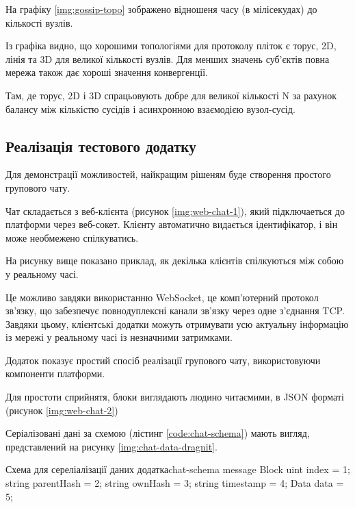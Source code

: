 \documentclass{lib/styles/default-style}
\begin{document}
    На графіку \ref{img:gossip-topo} зображено відношеня часу (в мілісекудах) до кількості вузлів.


    Із графіка видно, що хорошими топологіями для протоколу пліток є торус, 2D,
    лінія та 3D для великої кількості вузлів.
    Для менших значень суб'єктів повна мережа також дає хороші значення конвергенції.

    Там, де торус, 2D і 3D спрацьовують добре для великої кількості N
    за рахунок балансу між кількістю сусідів і асинхронною взаємодією вузол-сусід.
    
\subsection{Реалізація тестового додатку}

    Для демонстрації можливостей, найкращим рішеням буде створення простого групового чату.

    Чат складається з веб-клієнта (рисунок \ref{img:web-chat-1}), який підключаеться до платформи через веб-сокет.
    Клієнту автоматично видається ідентифікатор, і він може необмежено спілкуватись.


    На рисунку вище показано приклад, як декілька клієнтів спілкуються між собою у реальному часі.

    Це можливо завдяки використанню WebSocket,
    це комп'ютерний протокол зв'язку, що забезпечує повнодуплексні канали зв'язку через одне з'єднання TCP.
    Завдяки цьому, клієнтські додатки можуть отримувати усю актуальну інформацію із мережі у
    реальному часі із незначними затримками. 

    Додаток показує простий спосіб реалізації групового чату, використовуючи компоненти платформи.

    Для простоти сприйнятя, блоки виглядають людино читаємими, в JSON форматі (рисунок \ref{img:web-chat-2})


    Серіалізовані дані за схемою (лістинг \ref{code:chat-schema}) мають вигляд, представлений на рисунку
    \ref{img:chat-data-dragnit}.

    \begin{stdout}{Схема для сереліалізації даних додатка}{chat-schema}
        message Block {
            uint index = 1;
            string parentHash = 2;
            string ownHash = 3;
            string timestamp = 4;
            Data data = 5;
        }\end{stdout}
\end{document}
